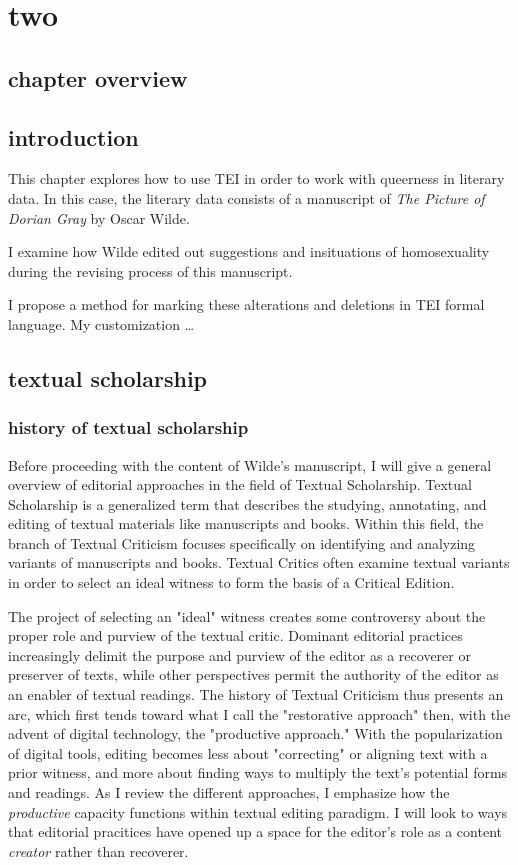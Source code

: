 \documentclass[11pt]{article}
\author{Filipa  Calado}
\date{\today}
\title{}
\begin{document}
\tableofcontents

\section{two}
\label{sec:orgdf26277}
\subsection{chapter overview}
\label{sec:org1581e8f}
\subsection{introduction}
\label{sec:org7c51c8a}

This chapter explores how to use TEI in order to work with queerness
in literary data. In this case, the literary data consists of a
manuscript of \emph{The Picture of Dorian Gray} by Oscar Wilde.

I examine how Wilde edited out suggestions and insituations of
homosexuality during the revising process of this manuscript.

I propose a method for marking these alterations and deletions in TEI
formal language. My customization \ldots{} 

\subsection{textual scholarship}
\label{sec:org96ad1bd}
\subsubsection{history of textual scholarship}
\label{sec:org472d4bc}
Before proceeding with the content of Wilde's manuscript, I will give
a general overview of editorial approaches in the field of Textual
Scholarship. Textual Scholarship is a generalized term that describes
the studying, annotating, and editing of textual materials like
manuscripts and books. Within this field, the branch of Textual
Criticism focuses specifically on identifying and analyzing variants
of manuscripts and books. Textual Critics often examine textual
variants in order to select an ideal witness to form the basis of a
Critical Edition.

The project of selecting an "ideal" witness creates some controversy
about the proper role and purview of the textual critic. Dominant
editorial practices increasingly delimit the purpose and purview of
the editor as a recoverer or preserver of texts, while other
perspectives permit the authority of the editor as an enabler of
textual readings. The history of Textual Criticism thus presents an
arc, which first tends toward what I call the "restorative approach"
then, with the advent of digital technology, the "productive
approach." With the popularization of digital tools, editing becomes
less about "correcting" or aligning text with a prior witness, and
more about finding ways to multiply the text's potential forms and
readings. As I review the different approaches, I emphasize how the
\emph{productive} capacity functions within textual editing paradigm. I
will look to ways that editorial pracitices have opened up a space for
the editor's role as a content \emph{creator} rather than recoverer.
\end{document}
